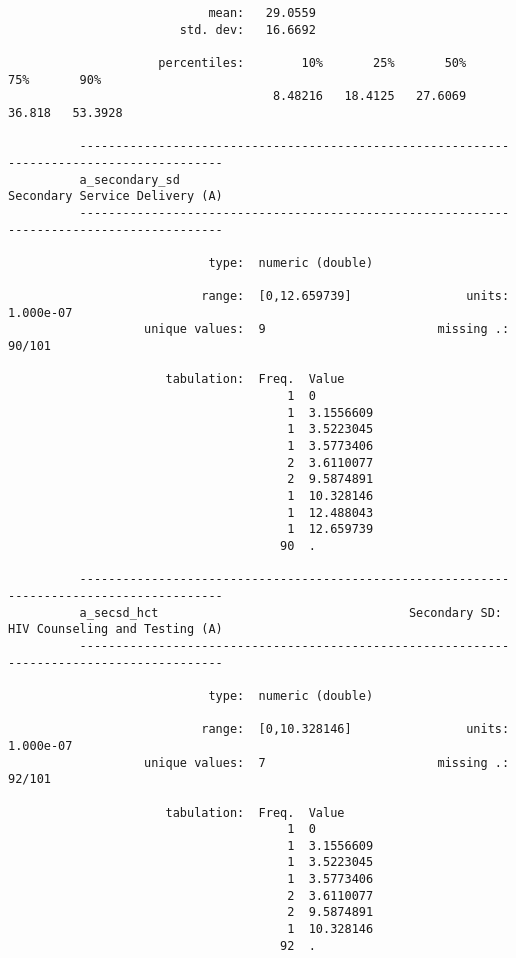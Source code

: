 \documentclass{article}
\begin{document}
\begin{verbatim}
                            mean:   29.0559
                        std. dev:   16.6692
          
                     percentiles:        10%       25%       50%       75%       90%
                                     8.48216   18.4125   27.6069    36.818   53.3928
          
          ------------------------------------------------------------------------------------------
          a_secondary_sd                                              Secondary Service Delivery (A)
          ------------------------------------------------------------------------------------------
          
                            type:  numeric (double)
          
                           range:  [0,12.659739]                units:  1.000e-07
                   unique values:  9                        missing .:  90/101
          
                      tabulation:  Freq.  Value
                                       1  0
                                       1  3.1556609
                                       1  3.5223045
                                       1  3.5773406
                                       2  3.6110077
                                       2  9.5874891
                                       1  10.328146
                                       1  12.488043
                                       1  12.659739
                                      90  .
          
          ------------------------------------------------------------------------------------------
          a_secsd_hct                                   Secondary SD: HIV Counseling and Testing (A)
          ------------------------------------------------------------------------------------------
          
                            type:  numeric (double)
          
                           range:  [0,10.328146]                units:  1.000e-07
                   unique values:  7                        missing .:  92/101
          
                      tabulation:  Freq.  Value
                                       1  0
                                       1  3.1556609
                                       1  3.5223045
                                       1  3.5773406
                                       2  3.6110077
                                       2  9.5874891
                                       1  10.328146
                                      92  .
          

\end{verbatim}
\end{document}

